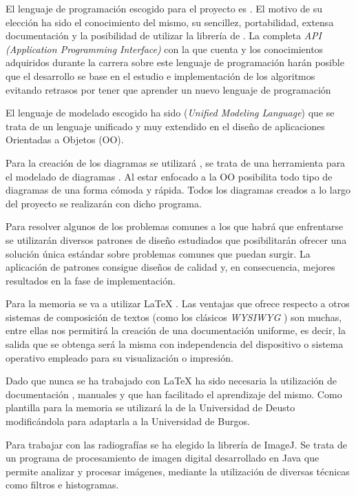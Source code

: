 El lenguaje de programación escogido para el proyecto es \javaversion{}. El motivo de su elección ha sido el conocimiento del mismo, su sencillez, portabilidad, extensa documentación y la posibilidad de utilizar la librería de \weka{}. La completa \textit{API (Application Programming Interface)} con la que cuenta y los conocimientos adquiridos durante la carrera sobre este lenguaje de programación harán posible que el desarrollo se base en el estudio e implementación de los algoritmos evitando retrasos por tener que aprender un nuevo lenguaje de programación

El lenguaje de modelado escogido ha sido \uml{} (\textit{Unified Modeling Language}) que se trata de un lenguaje unificado y muy extendido en el diseño de aplicaciones Orientadas a Objetos (OO).

Para la creación de los diagramas se utilizará \jude{}, se trata de una herramienta para el modelado de diagramas \uml{}. Al estar enfocado a la OO posibilita todo tipo de diagramas de una forma cómoda y rápida. Todos los diagramas creados a lo largo del proyecto se realizarán con dicho programa.

Para resolver algunos de los problemas comunes a los que habrá que enfrentarse se utilizarán diversos patrones de diseño \cite{patrones} estudiados que posibilitarán ofrecer una solución única estándar sobre problemas comunes que puedan surgir. La aplicación de patrones consigue diseños de calidad y, en consecuencia, mejores resultados en la fase de implementación.

Para la memoria se va a utilizar \LaTeX{} . Las ventajas que ofrece respecto a otros sistemas de composición de textos (como los clásicos \textit{WYSIWYG} ) son muchas, entre ellas nos permitirá la creación de una documentación uniforme, es decir, la salida que se obtenga será la misma con independencia del dispositivo o sistema operativo empleado para su visualización o impresión.

Dado que nunca se ha trabajado con \LaTeX{} ha sido necesaria la utilización de documentación , manuales  y  que han facilitado el aprendizaje del mismo. Como plantilla para la memoria se utilizará la de la Universidad de Deusto  modificándola para adaptarla a la Universidad de Burgos.

Para trabajar con las radiografías se ha elegido la librería de ImageJ. Se trata de un programa de procesamiento de imagen digital desarrollado en Java que permite analizar y procesar imágenes, mediante la utilización de diversas técnicas como filtros e histogramas.


